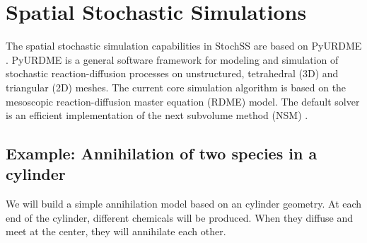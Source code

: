 \chapter{Spatial Stochastic Simulations}


The spatial stochastic simulation capabilities in StochSS are based on PyURDME \cite{urdme}. PyURDME is a general software framework for modeling and simulation of stochastic reaction-diffusion processes on unstructured, tetrahedral (3D) and triangular (2D) meshes. The current core simulation algorithm is based on the mesoscopic reaction-diffusion master equation (RDME) model. The default solver is an efficient implementation of the next subvolume method (NSM) \cite{nsm}.

\section{Example: Annihilation of two species in a cylinder}
We will build a simple annihilation model based on an cylinder geometry. At each end of the cylinder, different chemicals will be produced. When they diffuse and meet at the center, they will annihilate each other.
